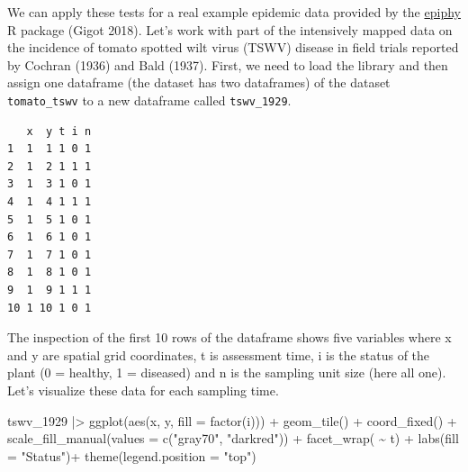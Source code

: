 \documentclass[
  letterpaper,
  DIV=11,
  numbers=noendperiod]{scrreprt}
\newenvironment{Shaded}{\begin{snugshade}}{\end{snugshade}}
\newcommand{\AttributeTok}[1]{\textcolor[rgb]{0.40,0.45,0.13}{#1}}
\newcommand{\DecValTok}[1]{\textcolor[rgb]{0.68,0.00,0.00}{#1}}
\newcommand{\FunctionTok}[1]{\textcolor[rgb]{0.28,0.35,0.67}{#1}}
\newcommand{\NormalTok}[1]{\textcolor[rgb]{0.00,0.23,0.31}{#1}}
\newcommand{\OtherTok}[1]{\textcolor[rgb]{0.00,0.23,0.31}{#1}}
\newcommand{\SpecialCharTok}[1]{\textcolor[rgb]{0.37,0.37,0.37}{#1}}
\newcommand{\StringTok}[1]{\textcolor[rgb]{0.13,0.47,0.30}{#1}}
\begin{document}
We can apply these tests for a real example epidemic data provided by
the \href{https://chgigot.github.io/epiphy/}{epiphy} R package (Gigot
2018). Let's work with part of the intensively mapped data on the
incidence of tomato spotted wilt virus (TSWV) disease in field trials
reported by Cochran (1936) and Bald (1937). First, we need to load the
library and then assign one dataframe (the dataset has two dataframes)
of the dataset \texttt{tomato\_tswv} to a new dataframe called
\texttt{tswv\_1929}.

\begin{Shaded}
\end{Shaded}

\begin{verbatim}
   x  y t i n
1  1  1 1 0 1
2  1  2 1 1 1
3  1  3 1 0 1
4  1  4 1 1 1
5  1  5 1 0 1
6  1  6 1 0 1
7  1  7 1 0 1
8  1  8 1 0 1
9  1  9 1 1 1
10 1 10 1 0 1
\end{verbatim}

The inspection of the first 10 rows of the dataframe shows five
variables where x and y are spatial grid coordinates, t is assessment
time, i is the status of the plant (0 = healthy, 1 = diseased) and n is
the sampling unit size (here all one). Let's visualize these data for
each sampling time.

\begin{Shaded}
\begin{Highlighting}[]
\NormalTok{tswv\_1929 }\SpecialCharTok{|\textgreater{}}
  \FunctionTok{ggplot}\NormalTok{(}\FunctionTok{aes}\NormalTok{(x, y, }\AttributeTok{fill =} \FunctionTok{factor}\NormalTok{(i))) }\SpecialCharTok{+}
  \FunctionTok{geom\_tile}\NormalTok{() }\SpecialCharTok{+}
  \FunctionTok{coord\_fixed}\NormalTok{() }\SpecialCharTok{+}
  \FunctionTok{scale\_fill\_manual}\NormalTok{(}\AttributeTok{values =} \FunctionTok{c}\NormalTok{(}\StringTok{"gray70"}\NormalTok{, }\StringTok{"darkred"}\NormalTok{)) }\SpecialCharTok{+}
  \FunctionTok{facet\_wrap}\NormalTok{( }\SpecialCharTok{\textasciitilde{}}\NormalTok{ t) }\SpecialCharTok{+}
  \FunctionTok{labs}\NormalTok{(}\AttributeTok{fill =} \StringTok{"Status"}\NormalTok{)}\SpecialCharTok{+}
  \FunctionTok{theme}\NormalTok{(}\AttributeTok{legend.position =} \StringTok{"top"}\NormalTok{)}
\end{Highlighting}
\end{Shaded}
\end{document}
